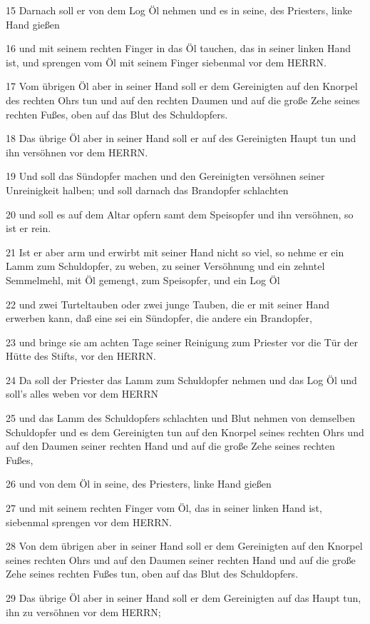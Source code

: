 \par 15 Darnach soll er von dem Log Öl nehmen und es in seine, des Priesters, linke Hand gießen
\par 16 und mit seinem rechten Finger in das Öl tauchen, das in seiner linken Hand ist, und sprengen vom Öl mit seinem Finger siebenmal vor dem HERRN.
\par 17 Vom übrigen Öl aber in seiner Hand soll er dem Gereinigten auf den Knorpel des rechten Ohrs tun und auf den rechten Daumen und auf die große Zehe seines rechten Fußes, oben auf das Blut des Schuldopfers.
\par 18 Das übrige Öl aber in seiner Hand soll er auf des Gereinigten Haupt tun und ihn versöhnen vor dem HERRN.
\par 19 Und soll das Sündopfer machen und den Gereinigten versöhnen seiner Unreinigkeit halben; und soll darnach das Brandopfer schlachten
\par 20 und soll es auf dem Altar opfern samt dem Speisopfer und ihn versöhnen, so ist er rein.
\par 21 Ist er aber arm und erwirbt mit seiner Hand nicht so viel, so nehme er ein Lamm zum Schuldopfer, zu weben, zu seiner Versöhnung und ein zehntel Semmelmehl, mit Öl gemengt, zum Speisopfer, und ein Log Öl
\par 22 und zwei Turteltauben oder zwei junge Tauben, die er mit seiner Hand erwerben kann, daß eine sei ein Sündopfer, die andere ein Brandopfer,
\par 23 und bringe sie am achten Tage seiner Reinigung zum Priester vor die Tür der Hütte des Stifts, vor den HERRN.
\par 24 Da soll der Priester das Lamm zum Schuldopfer nehmen und das Log Öl und soll's alles weben vor dem HERRN
\par 25 und das Lamm des Schuldopfers schlachten und Blut nehmen von demselben Schuldopfer und es dem Gereinigten tun auf den Knorpel seines rechten Ohrs und auf den Daumen seiner rechten Hand und auf die große Zehe seines rechten Fußes,
\par 26 und von dem Öl in seine, des Priesters, linke Hand gießen
\par 27 und mit seinem rechten Finger vom Öl, das in seiner linken Hand ist, siebenmal sprengen vor dem HERRN.
\par 28 Von dem übrigen aber in seiner Hand soll er dem Gereinigten auf den Knorpel seines rechten Ohrs und auf den Daumen seiner rechten Hand und auf die große Zehe seines rechten Fußes tun, oben auf das Blut des Schuldopfers.
\par 29 Das übrige Öl aber in seiner Hand soll er dem Gereinigten auf das Haupt tun, ihn zu versöhnen vor dem HERRN;
